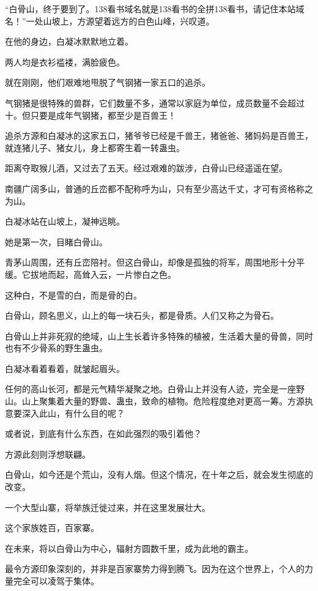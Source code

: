 
\begin{this_body}

“白骨山，终于要到了。138看书域名就是138看书的全拼138看书，请记住本站域名！”一处山坡上，方源望着远方的白色山峰，兴叹道。

在他的身边，白凝冰默默地立着。

两人均是衣衫褴褛，满脸疲色。

就在刚刚，他们艰难地甩脱了气钢猪一家五口的追杀。

气钢猪是很特殊的兽群，它们数量不多，通常以家庭为单位，成员数量不会超过十。但只要是成年气钢猪，都至少是百兽王！

追杀方源和白凝冰的这家五口，猪爷爷已经是千兽王，猪爸爸、猪妈妈是百兽王，就连猪儿子、猪女儿，身上都寄生着一转蛊虫。

距离夺取猴儿酒，又过去了五天。经过艰难的跋涉，白骨山已经遥遥在望。

南疆广阔多山，普通的丘峦都不配称呼为山，只有至少高达千丈，才可有资格称之为山。

白凝冰站在山坡上，凝神远眺。

她是第一次，目睹白骨山。

青茅山周围，还有丘峦陪衬。但这白骨山，却像是孤独的将军，周围地形十分平缓。它拔地而起，高耸入云，一片惨白之色。

这种白，不是雪的白，而是骨的白。

白骨山，顾名思义，山上的每一块石头，都是骨质。人们又称之为骨石。

白骨山上并非死寂的绝域，山上生长着许多特殊的植被，生活着大量的骨兽，同时也有不少骨系的野生蛊虫。

白凝冰看着看着，就皱起眉头。

任何的高山长河，都是元气精华凝聚之地。白骨山上并没有人迹，完全是一座野山。山上聚集着大量的野兽、蛊虫，致命的植物。危险程度绝对更高一筹。方源执意要深入此山，有什么目的呢？

或者说，到底有什么东西，在如此强烈的吸引着他？

方源此刻则浮想联翩。

白骨山，如今还是个荒山，没有人烟。但这个情况，在十年之后，就会发生彻底的改变。

一个大型山寨，将举族迁徙过来，并在这里发展壮大。

这个家族姓百，百家寨。

在未来，将以白骨山为中心，辐射方圆数千里，成为此地的霸主。

最令方源印象深刻的，并非是百家寨势力得到腾飞。因为在这个世界上，个人的力量完全可以凌驾于集体。


\end{this_body}

